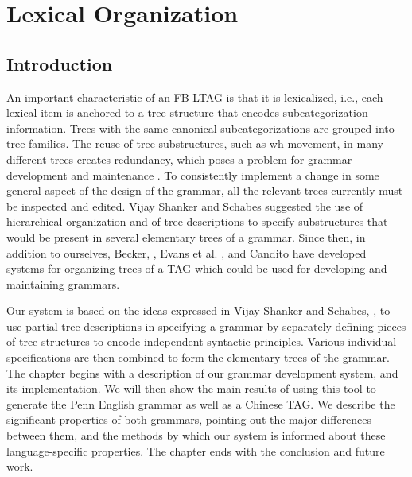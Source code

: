 

\chapter{Lexical Organization}
\label{lexorg}


% 


%

%


\section{Introduction}


An important characteristic of an
FB-LTAG is that it is lexicalized, i.e., each lexical item is anchored to a
tree structure that encodes subcategorization information.  Trees with the same
canonical subcategorizations are grouped into tree families.  The reuse of tree
substructures, such as wh-movement,
 in many different trees 
creates redundancy, which poses a problem for grammar development
and maintenance \cite{vijay-schabes92}.  To consistently implement a change in
some general aspect of the design of the grammar, all the relevant trees
currently must be inspected and edited.  Vijay Shanker and Schabes suggested
the use of hierarchical organization and of tree descriptions to specify
substructures that would be present in several elementary trees of a grammar.
Since then, in addition to ourselves, 
Becker, \cite{becker94}, Evans et al. \cite{Evans95}, and 
Candito\cite{Candito96} have
developed systems for organizing trees of a TAG which could be used for
developing and maintaining grammars.

 Our system is based
on the ideas expressed in Vijay-Shanker and Schabes, \cite{vijay-schabes92}, to
use partial-tree descriptions in specifying a grammar by separately defining
pieces of tree structures to encode independent syntactic principles. Various
individual specifications are then combined to form the elementary trees of the
grammar. The chapter begins with a description of 
our grammar development system, and its implementation. We will then
show the main results of using this tool to generate 
the Penn English grammar as well as a Chinese
TAG.  We describe the significant properties of both grammars, pointing out the
major differences between them, and the methods by which our system is informed
about these language-specific properties.  The chapter ends with the conclusion
and future work.




